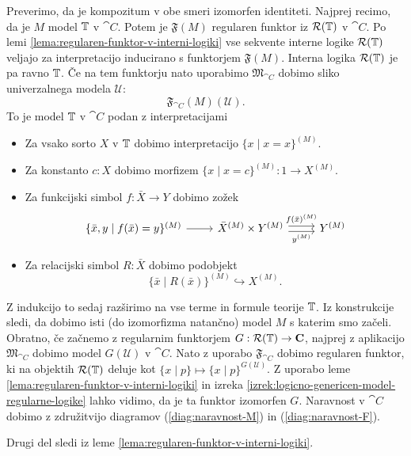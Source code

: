 \documentclass[../kategoricna_logika.tex]{subfiles}
\begin{document}
\begin{dokaz}
  Preverimo, da je kompozitum v obe smeri izomorfen identiteti.
  Najprej recimo, da je $M$ model $\mathbb{T}$ v $\cat{C}$. Potem je
  $\mathfrak{F}(M)$ regularen funktor iz $\mathcal{R}(\mathbb{T})$ v
  $\cat{C}$. Po lemi \ref{lema:regularen-funktor-v-interni-logiki} vse
  sekvente interne logike $\mathcal{R}(\mathbb{T})$ veljajo za
  interpretacijo inducirano s funktorjem $\mathfrak{F}(M)$. Interna
  logika $\mathcal{R}(\mathbb{T})$ je pa ravno $\mathbb{T}$.  Če na tem funktorju nato
  uporabimo $\mathfrak{M}_{\cat{C}}$ dobimo sliko univerzalnega modela
  $\mathcal{U}$:
  \[ \mathfrak{F}_{\cat{C}}(M)(\mathcal{U}).\] To je model $\mathbb{T}$ v
  $\cat{C}$ podan z interpretacijami
  \begin{itemize}
  \item Za vsako sorto $X$ v $\mathbb{T}$ dobimo interpretacijo
    $\{ x \mid x = x\}^{(M)}$.
  \item Za konstanto $c : X$ dobimo morfizem
    $\{ x \mid x = c\}^{(M)} : 1 \to X^{(M)}$.
  \item Za funkcijski simbol $f : \bar{X} \to Y$ dobimo zožek
    \begin{equation*}
      \begin{tikzcd}
        \{ \bar{x},y \mid f(\bar{x}) = y\}^{(M)} \ar[r] &
        \bar{X}^{(M)} \times Y^{(M)} \ar[r, shift left,
        "f(\bar{x})^{(M)}"] \ar[r, shift right, "y^{(M)}"'] & Y^{(M)}
      \end{tikzcd}
    \end{equation*}
  \item Za relacijski simbol $R : \bar{X}$ dobimo podobjekt
    \[ \{ \bar{x} \mid R(\bar{x})\}^{(M)} \hookrightarrow X^{(M)}.\]
  \end{itemize}
  Z indukcijo to sedaj razširimo na vse terme in formule teorije $\mathbb{T}$.
  Iz konstrukcije sledi, da dobimo isti (do izomorfizma natančno)
  model $M$ s katerim smo začeli.  Obratno, če začnemo z regularnim
  funktorjem $G : \mathcal{R}(\mathbb{T}) \to {\operatorname{\mathbf{C}}}$, najprej z aplikacijo
  $\mathfrak{M}_{\cat{C}}$ dobimo model $G(\mathcal{U})$ v
  $\cat{C}$. Nato z uporabo $\mathfrak{F}_{\cat{C}}$ dobimo regularen
  funktor, ki na objektih $\mathcal{R}(\mathbb{T})$ deluje kot
  $\{ x \mid p\} \mapsto \{ x \mid p\}^{G(\mathcal{U})}$. Z uporabo
  leme \ref{lema:regularen-funktor-v-interni-logiki} in izreka
  \ref{izrek:logicno-genericen-model-regularne-logike} lahko vidimo,
  da je ta funktor izomorfen $G$. Naravnost v $\cat{C}$ dobimo z
  združitvijo diagramov (\ref{diag:naravnost-M}) in
  (\ref{diag:naravnost-F}).

  Drugi del sledi iz leme
  \ref{lema:regularen-funktor-v-interni-logiki}.
\end{dokaz}
\end{document}
